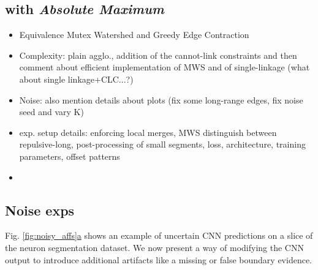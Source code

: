\subsection{\algname{} with \emph{Absolute Maximum}}

\begin{itemize}
\item Equivalence Mutex Watershed and Greedy Edge Contraction
\item Complexity: plain agglo., addition of the cannot-link constraints and then comment about efficient implementation of MWS and of single-linkage (what about single linkage+CLC...?)
\item Noise: also mention details about plots (fix some long-range edges, fix noise seed and vary K)
\item exp. setup details: enforcing local merges, MWS distinguish between repulsive-long, post-processing of small segments, loss, architecture, training parameters, offset patterns
\item 

\end{itemize}

\subsection{Noise exps}
Fig. \hyperref[fig:noisy_affs]{\ref*{fig:noisy_affs}a} shows an example of uncertain CNN predictions on a slice of the neuron segmentation dataset. We now present a way of modifying the CNN output to introduce additional artifacts like a missing or false boundary evidence. 


